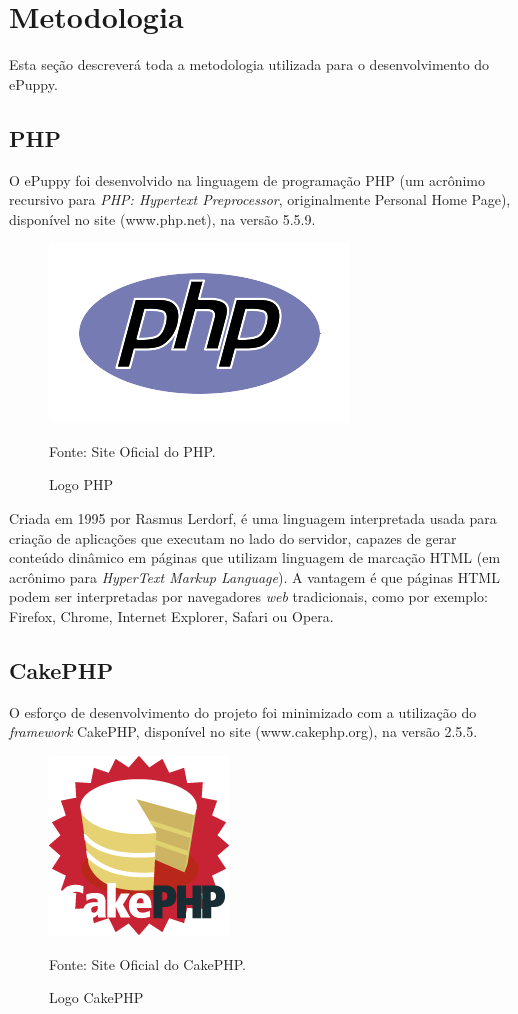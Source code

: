 \section{Metodologia}
Esta seção descreverá toda a metodologia utilizada para o desenvolvimento do ePuppy.

\subsection{PHP}
O ePuppy foi desenvolvido na linguagem de programação PHP (um acrônimo recursivo para {\it PHP: Hypertext Preprocessor}, originalmente Personal Home Page), disponível no site (www.php.net), na versão 5.5.9. 

\begin{figure}[!htb]
	\centering
	\includegraphics[scale=0.50
	]{imagens/php_logo}
	\caption{Logo PHP}
	Fonte: Site Oficial do PHP.
	\label{Rotulo}
\end{figure}

Criada em 1995 por Rasmus Lerdorf, é uma linguagem interpretada usada para criação de aplicações que executam no lado do servidor, capazes de gerar conteúdo dinâmico em páginas que utilizam linguagem de marcação HTML (em acrônimo para {\it HyperText Markup Language}). A vantagem é que páginas HTML \cite{Freeman2006} podem ser interpretadas por navegadores {\it web} tradicionais, como por exemplo: Firefox, Chrome, Internet Explorer, Safari ou Opera.


\subsection{CakePHP}
O esforço de desenvolvimento do projeto foi minimizado com a utilização do {\it framework} CakePHP, disponível no site (www.cakephp.org), na versão 2.5.5. 

\begin{figure}[!htb]
	\centering
	\includegraphics[scale=0.50
	]{imagens/cake-logo}
	\caption{Logo CakePHP}
	Fonte: Site Oficial do CakePHP.
	\label{Rotulo}
\end{figure}

